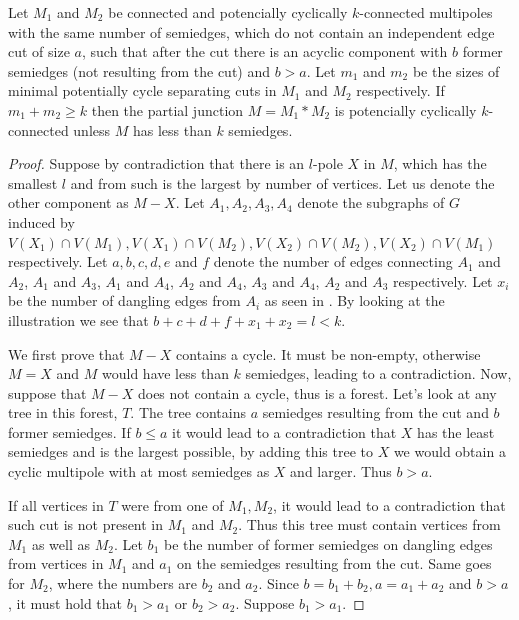 \documentclass[12pt, twoside]{book}
\begin{document}
\begin{theorem}\label{th:connecting-potencially-k-connected}
	Let $M_1$ and $M_2$ be connected and potencially cyclically $k$-connected multipoles with the same number of semiedges, which do not contain an independent edge cut of size $a$, such that after the cut there is an acyclic component with $b$ former semiedges (not resulting from the cut) and $b>a$. Let $m_1$ and $m_2$ be the sizes of minimal potentially cycle separating cuts in $M_1$ and $M_2$ respectively. If $m_1+m_2\geq k$ then the partial junction $M=M_1*M_2$ is potencially cyclically $k$-connected unless $M$ has less than $k$ semiedges.
\end{theorem}

\begin{proof}
	Suppose by contradiction that there is an $l$-pole $X$ in $M$, which has the smallest $l$ and from such is the largest by number of vertices. Let us denote the other component as $M-X$. Let $A_1,A_2,A_3,A_4$ denote the subgraphs of $G$ induced by $V(X_1)\cap V(M_1), V(X_1)\cap V(M_2), V(X_2)\cap V(M_2), V(X_2)\cap V(M_1)$ respectively. Let $a,b,c,d,e$ and $f$ denote the number of edges connecting $A_1$ and $A_2$, $A_1$ and $A_3$, $A_1$ and $A_4$, $A_2$ and $A_4$, $A_3$ and $A_4$, $A_2$ and $A_3$ respectively. Let $x_i$ be the number of dangling edges from $A_i$ as seen in . By looking at the illustration we see that $b+c+d+f+x_1+x_2=l<k$.
	
	We first prove that $M-X$ contains a cycle. It must be non-empty, otherwise $M=X$ and $M$ would have less than $k$ semiedges, leading to a contradiction. Now, suppose that $M-X$ does not contain a cycle, thus is a forest. Let's look at any tree in this forest, $T$. The tree contains $a$ semiedges resulting from the cut and $b$ former semiedges. If $b\leq a$ it would lead to a contradiction that $X$ has the least semiedges and is the largest possible, by adding this tree to $X$ we would obtain a cyclic multipole with at most semiedges as $X$ and larger. Thus $b>a$. 
	
	If all vertices in $T$ were from one of $M_1,M_2$, it would lead to a contradiction that such cut is not present in $M_1$ and $M_2$. Thus this tree must contain vertices from $M_1$ as well as $M_2$. Let $b_1$ be the number of former semiedges on dangling edges from vertices in $M_1$ and $a_1$ on the semiedges resulting from the cut. Same goes for $M_2$, where the numbers are $b_2$ and $a_2$. Since $b=b_1+b_2, a=a_1+a_2$ and $b>a$, it must hold that $b_1>a_1$ or $b_2>a_2$.  Suppose $b_1>a_1$.
	

\end{proof}
\end{document}
